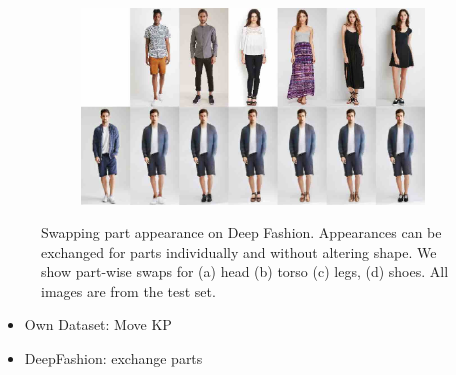 \begin{figure}[ht]
\begin{subfigure}{0.49\linewidth}
		\label{fig:part3_21}
		\end{subfigure}
		\begin{subfigure}{0.49\linewidth}
		\centering
		\includegraphics[trim={0cm 0cm 0cm 0cm},clip, width=1.\linewidth]{fig/factor/part6_30}\caption{}
		\label{fig:part3_30}
		\end{subfigure}
		\caption{Swapping part appearance on Deep Fashion. Appearances can be exchanged for parts individually and without altering shape. We show part-wise swaps for (a) head (b) torso (c) legs, (d) shoes. All images are from the test set.}
		\label{fig:partswaps}
	\end{figure}
	\begin{itemize}
		\item Own Dataset: Move KP
		\item DeepFashion: exchange parts
	\end{itemize}

